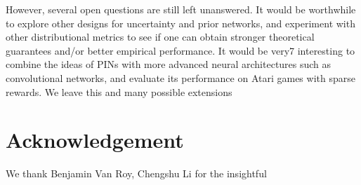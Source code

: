 \documentclass[letterpaper]{article} %
\theoremstyle{definition}
\begin{document}
However, several open questions are still left unanswered. It would be worthwhile to explore other designs for uncertainty and prior networks, and experiment with other distributional metrics to see if one can obtain stronger theoretical guarantees and/or better empirical performance. It would be very7 interesting to combine the ideas of PINs with more advanced neural architectures such as convolutional networks, and evaluate its performance on Atari games with sparse rewards. We leave this and many possible extensions

\vspace{-1.62mm}
\section{Acknowledgement}
We thank Benjamin Van Roy, Chengshu Li for the insightful

\medskip

\clearpage


\end{document}
